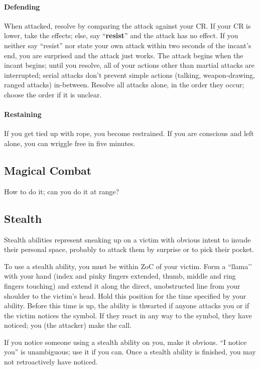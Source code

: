 \documentclass[sheet]{GL2020}
\begin{document}
\paragraph{Defending} When attacked, resolve by comparing the attack against your CR.  If your CR is lower, take the effects; else, say ``{\bf resist}'' and the attack has no effect.  If you neither say ``resist'' nor state your own attack within two seconds of the incant's end, you are surprised and the attack just works.  The attack begins when the incant begins; until you resolve, all of your actions other than martial attacks are interrupted; serial attacks don't prevent simple actions (talking, weapon-drawing, ranged attacks) in-between. Resolve all attacks alone, in the order they occur; choose the order if it is unclear.

\paragraph{Restaining} If you get tied up with rope, you become restrained.  If you are conscious and left alone, you can wriggle free in five minutes.

\subsection{Magical Combat}

How to do it; can you do it at range?

\subsection{Stealth}

Stealth abilities represent sneaking up on a victim with obvious intent to invade their personal space, probably to attack them by surprise or to pick their pocket.

To use a stealth ability, you must be within ZoC of your victim.  Form a ``llama’’ with your hand (index and pinky fingers extended, thumb, middle and ring fingers touching) and extend it along the direct, unobstructed line from your shoulder to the victim's head.  Hold this position for the time specified by your ability.  Before this time is up, the ability is thwarted if anyone attacks you or if the victim notices the symbol.  If they react in any way to the symbol, they have noticed; you (the attacker) make the call.

If you notice someone using a stealth ability on you, make it obvious. ``I notice you'' is unambiguous; use it if you can.  Once a stealth ability is finished, you may not retroactively have noticed.
\end{document}
